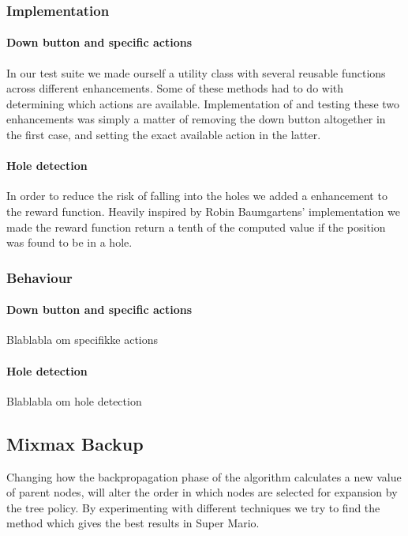 \documentclass[10pt,a4paper]{article}
\begin{document}
\subsubsection*{Implementation}

\paragraph{Down button and specific actions}
In our test suite we made ourself a utility class with several reusable functions across different enhancements. Some of these methods had to do with determining which actions are available. Implementation of and testing these two enhancements was simply a matter of removing the down button altogether in the first case, and setting the exact available action in the latter.


\paragraph{Hole detection}
In order to reduce the risk of falling into the holes we added a enhancement to the reward function. Heavily inspired by Robin Baumgartens' implementation we made the reward function return a tenth of the computed value if the position was found to be in a hole.

\subsubsection*{Behaviour}

\paragraph{Down button and specific actions}
Blablabla om specifikke actions

\paragraph{Hole detection}
Blablabla om hole detection

\subsection{Mixmax Backup} %
Changing how the backpropagation phase of the algorithm calculates a new value of parent nodes, will alter the order in which nodes are selected for expansion by the tree policy. By experimenting with different techniques we try to find the method which gives the best results in Super Mario. %
\end{document}
